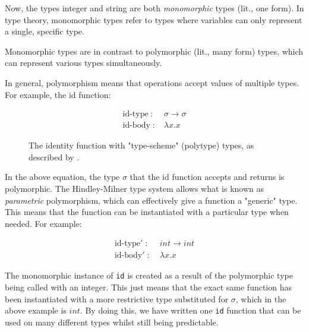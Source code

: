 \documentclass{l4proj}
\begin{document}
Now, the types integer and string are both \emph{monomorphic} types (lit., one form).
In type theory, monomorphic types refer to types where variables can only represent a single, specific type.

Monomorphic types are in contrast to polymorphic (lit., many form) types, which can represent various types simultaneously.







In general, polymorphism means that operations accept values of multiple types. For example, the id function:
\begin{figure}[H]
\begin{align*} 
   \text{id-type} \; :& \; \sigma \rightarrow \sigma\\
   \text{id-body} \; :& \; \lambda x . x
\end{align*}
\caption{The identity function with "type-scheme" (polytype) types, as described by \citet{Hindley_1969}.}
\end{figure}

In the above equation, the type $\sigma$ that the id function accepts and returns is polymorphic.
The Hindley-Milner type system allows what is known as \emph{parametric} polymorphism, which can effectively give a function a "generic" type.
This means that the function can be instantiated with a particular type when needed. 
For example:

\begin{align*}\label{eq:lambda-id-instantiated} 
    \text{id-type}' \; :& \; int \rightarrow int \\
    \text{id-body}' \; :& \; \lambda x . x
\end{align*}

The monomorphic instance of \texttt{id} is created as a result of the polymorphic type being called with an integer.
This just means that the exact same function has been instantiated with a more restrictive type substituted for $\sigma$, which in the above example is $int$.
By doing this, we have written one \texttt{id} function that can be used on many different types whilst still being predictable.
\end{document}
